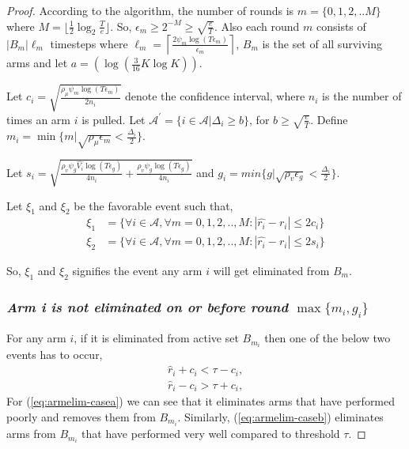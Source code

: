 \begin{proof}
According to the algorithm, the number of rounds is $m=\lbrace 0,1,2,.. M\rbrace $ where $M=\bigg\lfloor \frac{1}{2}\log_{2} \frac{T}{e}\bigg\rfloor$. So, $\epsilon_{m}\geq 2^{-M}\geq \sqrt{\frac{e}{T}}$. Also each round $m$ consists of $|B_{m}|\ell_{m}$ timesteps where $\ell_{m} = \left\lceil\frac{2\psi_{m}\log( T \epsilon_{m})}{\epsilon_{m}}\right\rceil$, $B_{m}$ is the set of all surviving arms and let $a=(\log(\frac{3}{16} K\log K))$.

Let $c_{i} = \sqrt{\frac{\rho_{\mu}\psi_{m} \log{(T\epsilon_{m})}}{2 n_{i}}}$ denote the confidence interval, where $n_{i}$ is the number of times an arm $i$ is pulled. Let $\mathcal{A}^{'}=\lbrace i\in \mathcal{A}|\Delta_{i}\geq b\rbrace$, for $b\geq \sqrt{\frac{e}{T}}$. Define $m_{i}=\min\lbrace m| \sqrt{\rho_{\mu}\epsilon_{m}}<\frac{\Delta_{i}}{2}\rbrace$.

Let $s_{i}=\sqrt{\frac{\rho_v\psi_{g} \hat{V_{i}} \log{( T\epsilon_{g})}}{4 n_{i}} + \frac{\rho_v\psi_{g} \log{( T\epsilon_{g})}}{4 n_{i}}}$ and 
$g_{i}=min\lbrace g| \sqrt{\rho_{v}\epsilon_{g}}<\frac{\Delta_{i}}{2}\rbrace$. 


Let $\xi_{1}$ and $\xi_{2}$ be the favorable event such that,
\begin{align*}
\xi_{1}&=\bigg\lbrace \forall i\in \mathcal{A}, \forall m=0,1,2,..,M: |\hat{r_i} - r_i| \leq 2c_i\bigg\rbrace\\
\xi_{2}&=\bigg\lbrace \forall i\in \mathcal{A}, \forall m=0,1,2,..,M: |\hat{r_i} - r_i| \leq  2s_i\bigg\rbrace
\end{align*}

So, $\xi_{1}$ and $\xi_{2}$ signifies the event any arm $i$ will get eliminated from $B_m$.

\subsubsection{\textit{Arm i is not eliminated on or before round $\max\lbrace m_{i},g_{i}\rbrace$}}

For any arm $i$, if it is eliminated from active set $B_{m_{i}}$ then one of the below two events has to occur,
\begin{align}
\hat{r}_{i} + c_{i} < \tau - c_{i}, \label{eq:armelim-casea}\\
\hat{r}_{i} - c_{i} > \tau + c_{i}, \label{eq:armelim-caseb}
\end{align}
For (\ref{eq:armelim-casea}) we can see that it eliminates arms that have performed poorly and removes them  from $B_{m_{i}}$. Similarly, (\ref{eq:armelim-caseb}) eliminates arms from $B_{m_{i}}$ that have performed very well compared to threshold $\tau$.


\end{proof}
